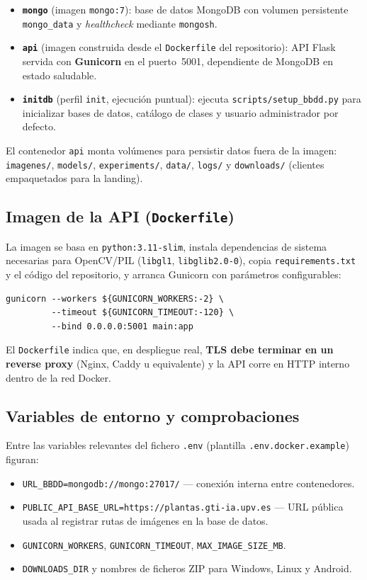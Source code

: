 \documentclass[11pt,spanish,listoffigures,listoftables]{tfgetsinf}
\begin{document}
\begin{itemize}
    \item \textbf{\texttt{mongo}} (imagen \texttt{mongo:7}): base de datos MongoDB con volumen persistente \texttt{mongo\_data} y \textit{healthcheck} mediante \texttt{mongosh}.
    \item \textbf{\texttt{api}} (imagen construida desde el \texttt{Dockerfile} del repositorio): API Flask servida con \textbf{Gunicorn} en el puerto~5001, dependiente de MongoDB en estado saludable.
    \item \textbf{\texttt{initdb}} (perfil \texttt{init}, ejecución puntual): ejecuta \texttt{scripts/setup\_bbdd.py} para inicializar bases de datos, catálogo de clases y usuario administrador por defecto.
\end{itemize}

El contenedor \texttt{api} monta volúmenes para persistir datos fuera de la imagen: \texttt{imagenes/}, \texttt{models/}, \texttt{experiments/}, \texttt{data/}, \texttt{logs/} y \texttt{downloads/} (clientes empaquetados para la landing).

\subsection{Imagen de la API (\texttt{Dockerfile})}

La imagen se basa en \texttt{python:3.11-slim}, instala dependencias de sistema necesarias para OpenCV/PIL (\texttt{libgl1}, \texttt{libglib2.0-0}), copia \texttt{requirements.txt} y el código del repositorio, y arranca Gunicorn con parámetros configurables:

\begin{verbatim}
gunicorn --workers ${GUNICORN_WORKERS:-2} \
         --timeout ${GUNICORN_TIMEOUT:-120} \
         --bind 0.0.0.0:5001 main:app
\end{verbatim}

El \texttt{Dockerfile} indica que, en despliegue real, \textbf{TLS debe terminar en un reverse proxy} (Nginx, Caddy u equivalente) y la API corre en HTTP interno dentro de la red Docker.

\subsection{Variables de entorno y comprobaciones}

Entre las variables relevantes del fichero \texttt{.env} (plantilla \texttt{.env.docker.example}) figuran:

\begin{itemize}
    \item \texttt{URL\_BBDD=mongodb://mongo:27017/} --- conexión interna entre contenedores.
    \item \texttt{PUBLIC\_API\_BASE\_URL=https://plantas.gti-ia.upv.es} --- URL pública usada al registrar rutas de imágenes en la base de datos.
    \item \texttt{GUNICORN\_WORKERS}, \texttt{GUNICORN\_TIMEOUT}, \texttt{MAX\_IMAGE\_SIZE\_MB}.
    \item \texttt{DOWNLOADS\_DIR} y nombres de ficheros ZIP para Windows, Linux y Android.
\end{itemize}
\end{document}
